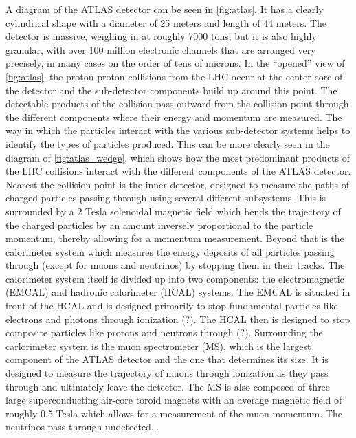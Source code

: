 A diagram of the ATLAS detector can be seen in \fig\ref{fig:atlas}.
It has a clearly cylindrical shape with a diameter of 25 meters
and length of 44 meters. The detector is massive, weighing
in at roughly 7000 tons; but it is also highly granular, with
over 100 million electronic channels that are arranged very precisely, 
in many cases on the order of tens of microns.
In the ``opened'' view of \fig\ref{fig:atlas}, the proton-proton
collisions from the LHC occur at the center core of the detector
and the sub-detector components build up around this point.
The detectable products of the collision pass outward from the collision
point through the different components where their energy and momentum
are measured. The way in which the particles interact with the various
sub-detector systems helps to identify the types of 
particles produced.
This can be more clearly seen in the diagram of 
\fig\ref{fig:atlas_wedge}, which shows how the most predominant
products of the LHC collisions interact with the different
components of the ATLAS detector.
Nearest the collision point is the inner detector, designed to 
measure the paths of charged particles passing through using several
different subsystems. This 
is surrounded by a 2 Tesla solenoidal magnetic field which 
bends the trajectory of the charged particles by an amount
inversely proportional to the particle momentum, thereby allowing
for a momentum measurement.  Beyond that is the calorimeter system
which measures the energy deposits of all particles passing 
through (except for muons and neutrinos) by stopping them in their 
tracks. The calorimeter system 
itself is divided up into two components: the electromagnetic (EMCAL)
and hadronic calorimeter (HCAL) systems.
The EMCAL is situated in front of the HCAL and is designed
primarily to stop fundamental particles like electrons and photons
through ionization (?). The HCAL then is designed to stop
composite particles like protons and neutrons through (?).
Surrounding the carlorimeter system is the muon spectrometer (MS),
which is the largest component of the ATLAS detector and the one
that determines its size. It is designed to measure the 
trajectory of muons through ionization as they pass through
and ultimately leave the detector. The MS is also composed of 
three large superconducting air-core toroid magnets with an 
average magnetic field of roughly 0.5 Tesla which allows for
a measurement of the muon momentum. The neutrinos 
pass through undetected...


